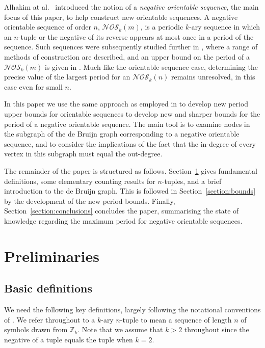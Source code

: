\documentclass[a4paper,11pt]{article}
\theoremstyle{plain}
\theoremstyle{definition}
\theoremstyle{remark}
\begin{document}
Alhakim at al.\ \cite{Alhakim24a} introduced the notion of a \emph{negative orientable sequence},
the main focus of this paper, to help construct new orientable sequences. A negative orientable
sequence of order $n$, $\mathcal{NOS}_k(m)$, is a periodic $k$-ary sequence in which an $n$-tuple
or the negative of its reverse appears at most once in a period of the sequence. Such sequences
were subsequently studied further in \cite{Mitchell25,Mitchell25a}, where a range of methods of
construction are described, and an upper bound on the period of a $\mathcal{NOS}_k(m)$ is given in
\cite{Mitchell25}.  Much like the orientable sequence case, determining the precise value of the
largest period for an $\mathcal{NOS}_k(n)$ remains unresolved, in this case even for small $n$.

In this paper we use the same approach as employed in \cite{Mitchell25} to develop new period upper
bounds for orientable sequences to develop new and sharper bounds for the period of a negative
orientable sequence.  The main tool is to examine nodes in the subgraph of the de Bruijn graph
corresponding to a negative orientable sequence, and to consider the implications of the fact that
the in-degree of every vertex in this subgraph must equal the out-degree.

The remainder of the paper is structured as follows.  Section~\ref{section:preliminaries} gives
fundamental definitions, some elementary counting results for $n$-tuples, and a brief introduction
to the de Bruijn graph. This is followed in Section~\ref{section:bounds} by the development of the
new period bounds. Finally, Section~\ref{section:conclusions} concludes the paper, summarising the
state of knowledge regarding the maximum period for negative orientable sequences.






\section{Preliminaries} \label{section:preliminaries}

\subsection{Basic definitions}

We need the following key definitions, largely following the notational conventions of
\cite{Mitchell25a}.  We refer throughout to a $k$-ary $n$-tuple to mean a sequence of length $n$ of
symbols drawn from $\mathbb{Z}_k$.  Note that we assume that $k>2$ throughout since the negative of
a tuple equals the tuple when $k=2$.
\end{document}
